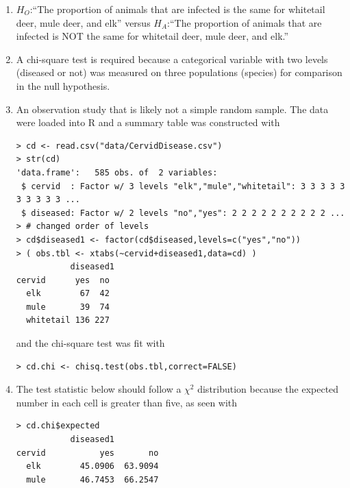 \documentclass[10pt,openany]{book}\usepackage[]{graphicx}\usepackage[]{color}
\makeatletter
\newenvironment{kframe}{%
 \def\at@end@of@kframe{}%
 \ifinner\ifhmode%
  \def\at@end@of@kframe{\end{minipage}}%
  \begin{minipage}{\columnwidth}%
 \fi\fi%
 \def\FrameCommand##1{\hskip\@totalleftmargin \hskip-\fboxsep
 \colorbox{shadecolor}{##1}\hskip-\fboxsep
     \hskip-\linewidth \hskip-\@totalleftmargin \hskip\columnwidth}%
 \MakeFramed {\advance\hsize-\width
   \@totalleftmargin\z@ \linewidth\hsize
   \@setminipage}}%
 {\par\unskip\endMakeFramed%
 \at@end@of@kframe}
\newenvironment{knitrout}{}{} %
\makeatother
\begin{document}
\begin{itemize}
\begin{enumerate}
      \item $H_{O}$:``The proportion of animals that are infected is the same for whitetail deer, mule deer, and elk'' versus $H_{A}$:``The proportion of animals that are infected is NOT the same for whitetail deer, mule deer, and elk.''
      \item A chi-square test is required because a categorical variable with two levels (diseased or not) was measured on three populations (species) for comparison in the null hypothesis.
      \item An observation study that is likely not a simple random sample.  The data were loaded into R and a summary table was constructed with
\begin{knitrout}
\color{fgcolor}\begin{kframe}
\begin{verbatim}
> cd <- read.csv("data/CervidDisease.csv")
> str(cd)
'data.frame':	585 obs. of  2 variables:
 $ cervid  : Factor w/ 3 levels "elk","mule","whitetail": 3 3 3 3 3 3 3 3 3 3 ...
 $ diseased: Factor w/ 2 levels "no","yes": 2 2 2 2 2 2 2 2 2 2 ...
> # changed order of levels
> cd$diseased1 <- factor(cd$diseased,levels=c("yes","no"))
> ( obs.tbl <- xtabs(~cervid+diseased1,data=cd) )
           diseased1
cervid      yes  no
  elk        67  42
  mule       39  74
  whitetail 136 227
\end{verbatim}
\end{kframe}
\end{knitrout}
and the chi-square test was fit with
\begin{knitrout}
\color{fgcolor}\begin{kframe}
\begin{verbatim}
> cd.chi <- chisq.test(obs.tbl,correct=FALSE)
\end{verbatim}
\end{kframe}
\end{knitrout}
      \item The test statistic below should follow a $\chi^{2}$ distribution because the expected number in each cell is greater than five, as seen with
\begin{knitrout}
\color{fgcolor}\begin{kframe}
\begin{verbatim}
> cd.chi$expected
           diseased1
cervid           yes       no
  elk        45.0906  63.9094
  mule       46.7453  66.2547

\end{verbatim}
\end{kframe}
\end{knitrout}
\end{enumerate}
\end{itemize}
\end{document}
